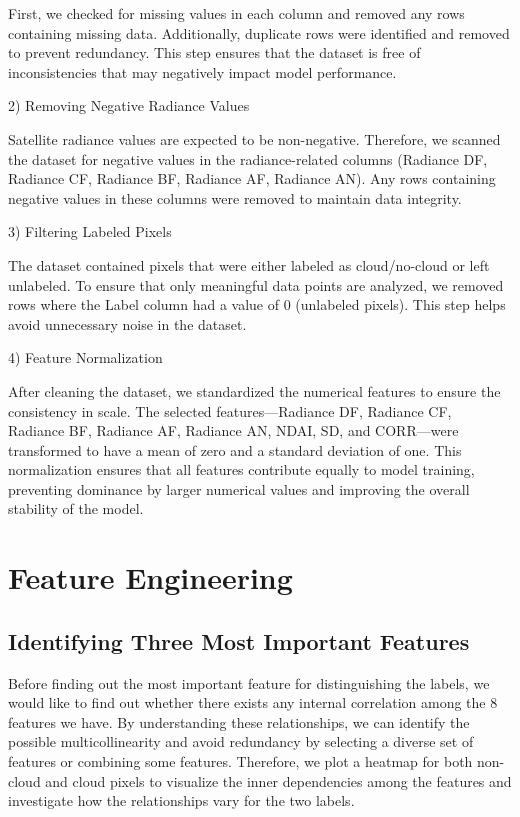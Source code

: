 \documentclass[10pt,letterpaper]{article}
\begin{document}
First, we checked for missing values in each column and removed any rows containing missing data. Additionally, duplicate rows were identified and removed to prevent redundancy. This step ensures that the dataset is free of inconsistencies that may negatively impact model performance.

2) Removing Negative Radiance Values

Satellite radiance values are expected to be non-negative. Therefore, we scanned the dataset for negative values in the radiance-related columns (Radiance DF, Radiance CF, Radiance BF, Radiance AF, Radiance AN). Any rows containing negative values in these columns were removed to maintain data integrity.

3) Filtering Labeled Pixels

The dataset contained pixels that were either labeled as cloud/no-cloud or left unlabeled. To ensure that only meaningful data points are analyzed, we removed rows where the Label column had a value of 0 (unlabeled pixels). This step helps avoid unnecessary noise in the dataset.

4) Feature Normalization

After cleaning the dataset, we standardized the numerical features to ensure the consistency in scale. The selected features—Radiance DF, Radiance CF, Radiance BF, Radiance AF, Radiance AN, NDAI, SD, and CORR—were transformed to have a mean of zero and a standard deviation of one. This normalization ensures that all features contribute equally to model training, preventing dominance by larger numerical values and improving the overall stability of the model. 


\section{Feature Engineering}

\subsection{Identifying Three Most Important Features}

Before finding out the most important feature for distinguishing the labels, we would like to find out whether there exists any internal correlation among the 8 features we have. By understanding these relationships, we can identify the possible multicollinearity and avoid redundancy by selecting a diverse set of features or combining some features. Therefore, we plot a heatmap for both non-cloud and cloud pixels to visualize the inner dependencies among the features and investigate how the relationships vary for the two labels.
\end{document}
